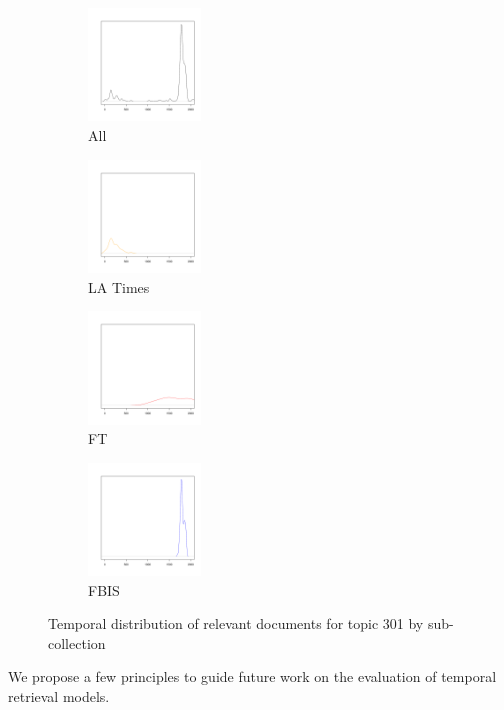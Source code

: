 \documentclass{sig-alternate}
\begin{document}
\begin{figure}
\begin{subfigure}[t]{1in}
\includegraphics[width=3cm]{analysis/301/301-trec8.pdf}
\caption{All}
\end{subfigure}
\begin{subfigure}[t]{1in}
\includegraphics[width=3cm]{analysis/301/301-la.pdf}
\caption{LA Times}
\end{subfigure}
\begin{subfigure}[t]{1in}
\includegraphics[width=3cm]{analysis/301/301-ft.pdf}
\caption{FT}
\end{subfigure}
\begin{subfigure}[t]{1in}
\includegraphics[width=3cm]{analysis/301/301-fbis.pdf}
\caption{FBIS}
\end{subfigure}
\caption{Temporal distribution of relevant documents for topic 301 by sub-collection} 
\label{fig.301}
\end{figure}


We propose a few principles to guide future work on the evaluation of temporal retrieval models.
\end{document}
